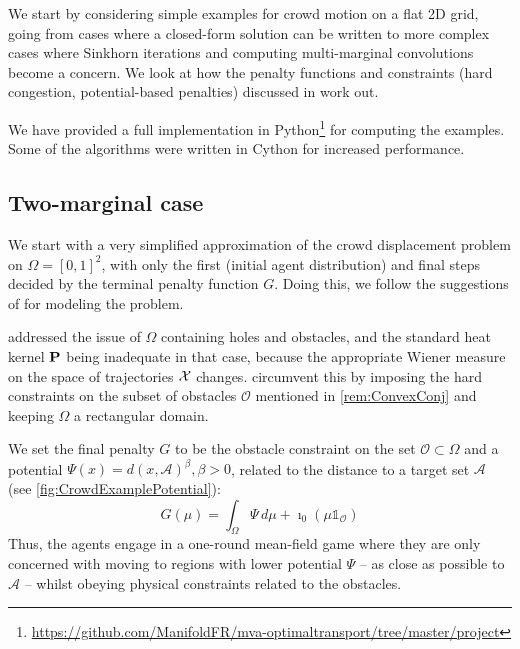 \documentclass[../report.tex]{subfiles}
\begin{document}
We start by considering simple examples for crowd motion on a flat 2D grid, going from cases where a closed-form solution can be written to more complex cases where Sinkhorn iterations and computing multi-marginal convolutions become a concern. We look at how the penalty functions and constraints (hard congestion, potential-based penalties) discussed in \textcite{benamou:hal-01295299} work out.

We have provided a full implementation in Python\footnote{\url{https://github.com/ManifoldFR/mva-optimaltransport/tree/master/project}} for computing the examples. Some of the algorithms were written in Cython for increased performance.


\subsection{Two-marginal case}

We start with a very simplified approximation of the crowd displacement problem on $\Omega = [0, 1]^2$, with only the first (initial agent distribution) and final steps decided by the terminal penalty function $G$. Doing this, we follow the suggestions of \textcite{benamou:hal-01295299} for modeling the problem.

\begin{remark}
	 addressed the issue of $\Omega$ containing holes and obstacles, and the standard heat kernel $\mathbf{P}$ being inadequate in that case, because the appropriate Wiener measure on the space of trajectories $\mathcal{X}$ changes. \textcite{benamou:hal-01295299} circumvent this by imposing the hard constraints on the subset of obstacles $\mathscr{O}$ mentioned in \cref{rem:ConvexConj} and keeping $\Omega$ a rectangular domain.
\end{remark}

We set the final penalty $G$ to be the obstacle constraint on the set $\mathscr{O}\subset\Omega$ and a potential $\Psi(x) = d(x, \mathscr A)^{\beta}, \beta > 0$, related to the distance to a target set $\mathscr{A}$ (see \cref{fig:CrowdExamplePotential}):
\[
	G(\mu) = \int_\Omega \Psi\,d\mu + \imath_{0}(\mu\mathds{1}_{\mathscr O})
\]
Thus, the agents engage in a one-round mean-field game where they are only concerned with moving to regions with lower potential $\Psi$ -- as close as possible to $\mathscr{A}$ -- whilst obeying physical constraints related to the obstacles.
\end{document}
